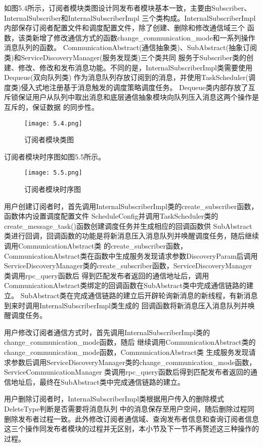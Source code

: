 如图5.4所示，订阅者模块类图设计同发布者模块基本一致，主要由Subscriber、InternalSubscriber和InternalSubscriberImpl
三个类构成。InternalSubscriberImpl内部保存订阅者配置文件和调度配置文件，除了创建、删除和修改通信域三个
函数，该类新增了修改通信方式的函数change\_communication\_mode和一系列操作消息队列的函数。
CommunicationAbstract(通信抽象类)、SubAbstract(抽象订阅类)和ServiceDiscoveryManager(服务发现类)三个类共同
服务于Subscriber类的创建、修改、修改和发布消息功能。不同的是，InternalSubscriberImpl类需要使用Dequeue(双向队列类)
作为消息队列存放订阅到的消息，并使用TaskScheduler(调度类)侵入式地注册基于消息触发的调度策略调度任务。
Dequeue类内部存放了互斥锁保证用户从队列中取出消息和底层通信抽象模块向队列压入消息这两个操作是互斥的，保证数据
的同步性。

\begin{figure}[htb]
  \centering
  \texttt{[image: 5.4.png]}
  \caption{订阅者模块类图}
  \label{fig:4}
\end{figure}

订阅者模块时序图如图5.5所示。
\begin{figure}[htb]
  \centering
  \texttt{[image: 5.5.png]}
  \caption{订阅者模块时序图}
  \label{fig:5}
\end{figure}

用户创建订阅者时，首先调用InternalSubscriberImpl类的create\_subscriber函数，函数体内设置调度配置文件
ScheduleConfig并调用TaskScheduler类的create\_message\_task()函数创建调度任务并生成相应的回调函数供
SubAbstract类进行回调，回调函数的功能是将新消息压入消息队列并唤醒调度任务，随后继续调用CommunicationAbstract类
的create\_subscriber函数，CommunicationAbstract类在函数中生成服务发现请求参数DiscoveryParam后调用
ServiceDiscoveryManager类的create\_subscriber函数，ServiceDiscoveryManager类调用rpc\_query函数后
得到匹配发布者返回的通信地址后，调用CommunicationAbstract类绑定的回调函数在SubAbstract类中完成通信链路的建立。
SubAbstract类在完成通信链路的建立后开辟轮询新消息的新线程，有新消息到来时调用InternalSubscriberImpl类生成的
回调函数将新消息压入消息队列并唤醒调度任务。

用户修改订阅者通信方式时，首先调用InternalSubscriberImpl类的change\_communication\_mode函数，随后
继续调用CommunicationAbstract类的change\_communication\_mode函数，CommunicationAbstract类
生成服务发现请求参数后调用ServiceDiscoveryManager类的change\_communication\_mode函数，ServiceCommunicationManager
类调用rpc\_query函数后得到匹配发布者返回的通信地址后，最终在SubAbstract类中完成通信链路的建立。

用户删除订阅者时，InternalSubscriberImpl类根据用户传入的删除模式DeleteType判断是否需要将消息队列
中的消息保存至用户空间，随后删除过程同删除发布者过程一致。此外修改订阅者通信域、查询发布者信息和查询订阅者信息这三个操作同发布者模块的过程并无区别，本小节及下一节不再赘述这三种操作的过程。

